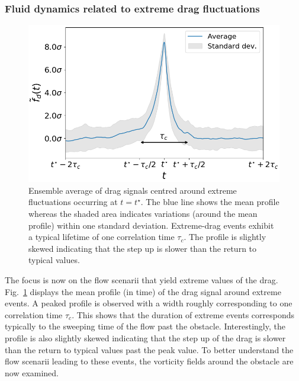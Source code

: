\documentclass{jfm}
\newcommand{\EL}[1]{{\color{myred}{#1}}}
\begin{document}
\subsubsection{Fluid dynamics related to extreme drag fluctuations}
\label{sec:dynamical_aspects}

\begin{figure}
  \centering
  \includegraphics[width=.7\linewidth]{timeseries_extremes/timeseries_extremes.png}
  \caption{\label{fig:timeseries_extremes} Ensemble average of drag signals centred around extreme fluctuations occurring  at $t=t^{\star}$. The blue line shows the mean profile whereas the shaded area indicates variations (around the mean profile) within one standard deviation. Extreme-drag events exhibit a typical lifetime of one correlation time $\tau_c$. The profile is slightly skewed indicating that the step up is slower than the return to typical values.}
\end{figure}

% 
The focus is now on the flow scenarii that yield extreme values of the drag.
Fig.~\ref{fig:timeseries_extremes} displays the mean profile (in time) of the drag signal around extreme events. A peaked profile is observed with a width roughly corresponding to one correlation time $\tau_c$. This shows that the duration of extreme events corresponds typically to the sweeping time of the flow past the obstacle.
Interestingly, the profile is also slightly skewed indicating that the step up of the drag is slower than the return to typical values past the peak value.
\EL{This asymmetry (under time reversal) is closely linked to the symmetry breaking in what happens before and after the obstacle.}
To better understand the flow scenarii leading to these events, the vorticity fields around the obstacle are now examined.
\end{document}
